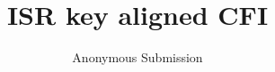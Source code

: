 \documentclass{sig-alternate-05-2015}
\begin{document}


\title{ISR key aligned CFI}
\author{Anonymous Submission}




\maketitle
%

%
%
%
%
%
%

%
%



\end{document}
